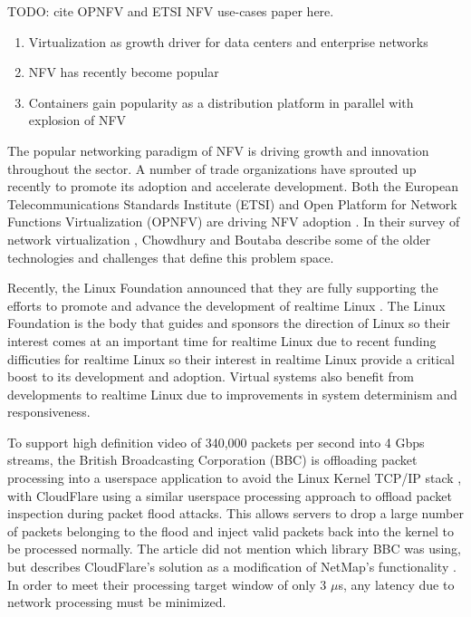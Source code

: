 TODO: cite OPNFV and ETSI NFV use-cases paper here.
\begin{enumerate}
  \item Virtualization as growth driver for data centers and enterprise networks
  \item NFV has recently become popular 
  \item Containers gain popularity as a distribution platform in parallel with explosion of NFV
\end{enumerate}

The popular networking paradigm of NFV is driving growth and innovation throughout the sector.
A number of trade organizations have sprouted up recently to promote its adoption and accelerate development.
Both the European Telecommunications Standards Institute (ETSI) and Open Platform for Network Functions Virtualization (OPNFV) \autocite{opnfv1} are driving NFV adoption \autocite{cohnopnfv}.
In their survey of network virtualization \autocite{_chowdhury_1}, Chowdhury and Boutaba describe some of the older technologies and challenges that define this problem space.


Recently, the Linux Foundation announced that they are fully supporting the efforts to promote and advance the development of realtime Linux \autocite{_linux_foundation_1}.
The Linux Foundation is the body that guides and sponsors the direction of Linux so their interest comes at an important time for realtime Linux due to recent funding difficuties for realtime Linux \autocite{_lwn_1} so their interest in realtime Linux provide a critical boost to its development and adoption.
Virtual systems also benefit from developments to realtime Linux due to improvements in system determinism and responsiveness.

To support high definition video of 340,000 packets per second into 4 Gbps streams, the British Broadcasting Corporation (BBC) is offloading packet processing into a userspace application to avoid the Linux Kernel TCP/IP stack \autocite{bbcbypass}, with CloudFlare using a similar userspace processing approach to offload packet inspection during packet flood attacks.
This allows servers to drop a large number of packets belonging to the flood and inject valid packets back into the kernel to be processed normally.  
The article did not mention which library BBC was using, but describes CloudFlare's solution as a modification of NetMap's functionality \autocite{netmapbertin}.
In order to meet their processing target window of only 3 $\mu$s, any latency due to network processing must be minimized.

